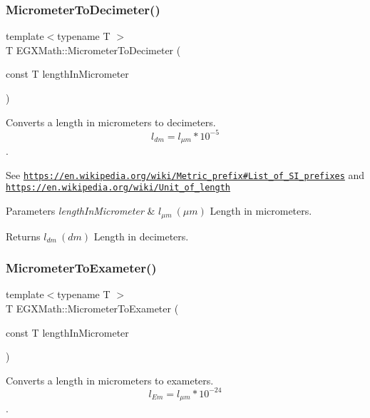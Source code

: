 \subsubsection{\texorpdfstring{Micrometer\+To\+Decimeter()}{MicrometerToDecimeter()}}
{\footnotesize\ttfamily template$<$typename T $>$ \\
T E\+G\+X\+Math\+::\+Micrometer\+To\+Decimeter (\begin{DoxyParamCaption}\item[{const T}]{length\+In\+Micrometer }\end{DoxyParamCaption})}



Converts a length in micrometers to decimeters. \[ l_{dm}=l_{\mu m} * 10^{-5} \]. 

See \href{https://en.wikipedia.org/wiki/Metric_prefix#List_of_SI_prefixes}{\tt https\+://en.\+wikipedia.\+org/wiki/\+Metric\+\_\+prefix\#\+List\+\_\+of\+\_\+\+S\+I\+\_\+prefixes} and \href{https://en.wikipedia.org/wiki/Unit_of_length}{\tt https\+://en.\+wikipedia.\+org/wiki/\+Unit\+\_\+of\+\_\+length} 
\begin{DoxyParams}{Parameters}
{\em length\+In\+Micrometer} & $ l_{\mu m}\ (\mu m)$ Length in micrometers. \\
\hline
\end{DoxyParams}
\begin{DoxyReturn}{Returns}
$ l_{dm}\ (dm)$ Length in decimeters. 
\end{DoxyReturn}
\mbox{\label{group___e_g_x_math-_conversions-_length_conversions-_micrometer-_s_i_ga0801b93a011bf0495bb3c96be2b47734}} 
\subsubsection{\texorpdfstring{Micrometer\+To\+Exameter()}{MicrometerToExameter()}}
{\footnotesize\ttfamily template$<$typename T $>$ \\
T E\+G\+X\+Math\+::\+Micrometer\+To\+Exameter (\begin{DoxyParamCaption}\item[{const T}]{length\+In\+Micrometer }\end{DoxyParamCaption})}



Converts a length in micrometers to exameters. \[ l_{Em}=l_{\mu m} * 10^{-24} \]. 

